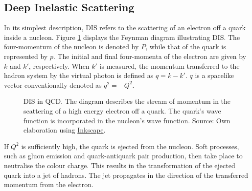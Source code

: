\subsection{Deep Inelastic Scattering}
\label{10.10::deep_inelastic_scattering}
    In its simplest description, DIS refers to the scattering of an electron off a quark inside a nucleon.
    Figure \ref{fig::dis_diagram} displays the Feynman diagram illustrating DIS.
    The four-momentum of the nucleon is denoted by $P$, while that of the quark is represented by $p$.
    The initial and final four-momenta of the electron are given by $k$ and $k'$, respectively.
    When $k'$ is measured, the momentum transferred to the hadron system by the virtual photon is defined as $q = k - k'$.
    $q$ is a spacelike vector conventionally denoted as $q^2 = -Q^2$.

    \begin{figure}[h!]
        \centering{}
        \caption[DIS in QCD.]{DIS in QCD. The diagram describes the stream of momentum in the scattering of a high energy electron off a quark. The quark's wave function is incorporated in the nucleon's wave function. Source: Own elaboration using \hyperlink{inkscape.org/}{Inkscape}.}
        \label{fig::dis_diagram}
    \end{figure}

    If $Q^2$ is sufficiently high, the quark is ejected from the nucleon.
    Soft processes, such as gluon emission and quark-antiquark pair production, then take place to neutralise the colour charge.
    This results in the transformation of the ejected quark into a jet of hadrons.
    The jet propagates in the direction of the transferred momentum from the electron.

    
    
    
